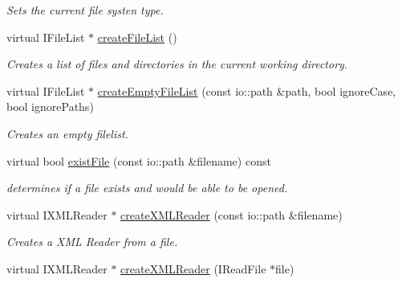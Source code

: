 \begin{DoxyCompactItemize}
\begin{DoxyCompactList}\small\item\em Sets the current file systen type. \end{DoxyCompactList}\item 
virtual I\-File\-List $\ast$ \hyperlink{classirr_1_1io_1_1_c_file_system_ad7e7f5f2a1d181fe626e98a938ddd25f}{create\-File\-List} ()
\begin{DoxyCompactList}\small\item\em Creates a list of files and directories in the current working directory. \end{DoxyCompactList}\item 
\hypertarget{classirr_1_1io_1_1_c_file_system_ab2b85fcee2ad606b8e7fc04f91e779cd}{virtual I\-File\-List $\ast$ \hyperlink{classirr_1_1io_1_1_c_file_system_ab2b85fcee2ad606b8e7fc04f91e779cd}{create\-Empty\-File\-List} (const io\-::path \&path, bool ignore\-Case, bool ignore\-Paths)}\label{classirr_1_1io_1_1_c_file_system_ab2b85fcee2ad606b8e7fc04f91e779cd}

\begin{DoxyCompactList}\small\item\em Creates an empty filelist. \end{DoxyCompactList}\item 
\hypertarget{classirr_1_1io_1_1_c_file_system_ad8fc90a75664df0eb23a69046ed45fd2}{virtual bool \hyperlink{classirr_1_1io_1_1_c_file_system_ad8fc90a75664df0eb23a69046ed45fd2}{exist\-File} (const io\-::path \&filename) const }\label{classirr_1_1io_1_1_c_file_system_ad8fc90a75664df0eb23a69046ed45fd2}

\begin{DoxyCompactList}\small\item\em determines if a file exists and would be able to be opened. \end{DoxyCompactList}\item 
\hypertarget{classirr_1_1io_1_1_c_file_system_a25e8dfa7316fc9f9d2233511402e1100}{virtual I\-X\-M\-L\-Reader $\ast$ \hyperlink{classirr_1_1io_1_1_c_file_system_a25e8dfa7316fc9f9d2233511402e1100}{create\-X\-M\-L\-Reader} (const io\-::path \&filename)}\label{classirr_1_1io_1_1_c_file_system_a25e8dfa7316fc9f9d2233511402e1100}

\begin{DoxyCompactList}\small\item\em Creates a X\-M\-L Reader from a file. \end{DoxyCompactList}\item 
\hypertarget{classirr_1_1io_1_1_c_file_system_a27349b7d0ab84563c21186902fd959c3}{virtual I\-X\-M\-L\-Reader $\ast$ \hyperlink{classirr_1_1io_1_1_c_file_system_a27349b7d0ab84563c21186902fd959c3}{create\-X\-M\-L\-Reader} (I\-Read\-File $\ast$file)}\label{classirr_1_1io_1_1_c_file_system_a27349b7d0ab84563c21186902fd959c3}


\end{DoxyCompactItemize}
